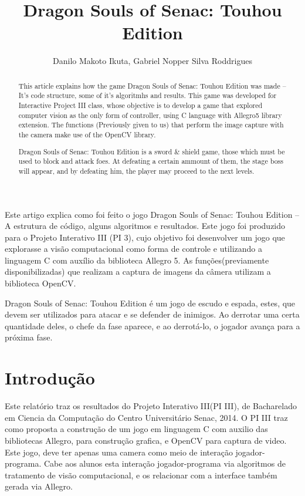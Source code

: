 \documentclass[12pt]{article}
\title{Dragon Souls of Senac: Touhou Edition}
\author{Danilo Makoto Ikuta\inst{1},  Gabriel Nopper Silva Roddrigues\inst{1}}
\begin{document}
 

\maketitle
     
\begin{resumo} 

Este artigo explica como foi feito o jogo Dragon Souls of Senac: Touhou Edition -- A estrutura de código, alguns algoritmos e resultados. Este jogo foi produzido para o Projeto Interativo III (PI 3), cujo objetivo foi desenvolver um jogo que explorasse a visão computacional como forma de controle e utilizando a linguagem C com auxílio da biblioteca Allegro 5. As funções(previamente disponibilizadas) que realizam a captura de imagens da câmera utilizam a biblioteca OpenCV.

Dragon Souls of Senac: Touhou Edition é um jogo de escudo e espada, estes, que devem ser utilizados para atacar e se defender de inimigos. Ao derrotar uma certa quantidade deles, o chefe da fase aparece, e ao derrotá-lo, o jogador avança para a próxima fase.

\end{resumo}

\begin{abstract}

This article explains how the game Dragon Souls of Senac: Touhou Edition was made -- It's code structure, some of it's algoritmhs and results. This game was developed for Interactive Project III class, whose objective is to develop a game that explored computer vision as the only form of controller, using C language with Allegro5 library extension. The functions (Previously given to us) that perform the image capture with the camera make use of the OpenCV library.

Dragon Souls of Senac: Touhou Edition is a sword \& shield game, those which must be used to block and attack foes. At defeating a certain ammount of them, the stage boss will appear, and by defeating him, the player may proceed to the next levels.

\end{abstract}

\section{Introdução}

Este relatório traz os resultados do Projeto Interativo III(PI III), de Bacharelado em Ciencia da Computação do Centro Universitário Senac, 2014.
O PI III traz como proposta a construção de um jogo em linguagem C com auxilio das bibliotecas Allegro, para construção grafica, e OpenCV para captura de video. Este jogo, deve ter apenas uma camera como meio de interação jogador-programa.
Cabe aos alunos esta interação jogador-programa via algoritmos de tratamento de visão computacional, e os relacionar com a interface também gerada via Allegro.
\end{document}
